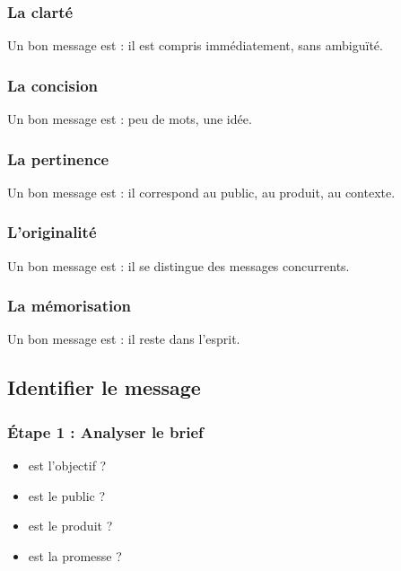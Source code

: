 \subsubsection{La clarté}

Un bon message est  : il est compris immédiatement, sans ambiguïté.

\subsubsection{La concision}

Un bon message est  : peu de mots, une idée.

\subsubsection{La pertinence}

Un bon message est  : il correspond au public, au produit, au contexte.

\subsubsection{L'originalité}

Un bon message est  : il se distingue des messages concurrents.

\subsubsection{La mémorisation}

Un bon message est  : il reste dans l'esprit.

\subsection{Identifier le message}

\subsubsection{Étape 1 : Analyser le brief}

\begin{itemize}
    \item {} est l'objectif ?
    \item {} est le public ?
    \item {} est le produit ?
    \item {} est la promesse ?
\end{itemize}

